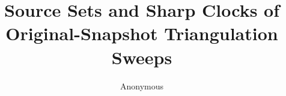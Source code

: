 \documentclass[a4paper,10pt]{amsart}
\title[Original-snapshot triangulation sweeps]{Source Sets and Sharp Clocks of\\ Original-Snapshot Triangulation Sweeps}
\author{Anonymous}
\date{}
\begin{document}
\begin{abstract}

\end{abstract}
\maketitle









\end{document}
